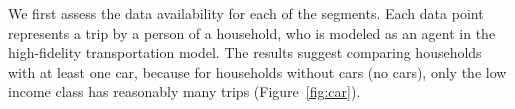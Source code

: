 We first assess the data availability for each of the segments. Each data point represents a trip by a person of a household, who is  modeled as an agent in the high-fidelity transportation model. The results suggest comparing households with at least one car, because for households without cars (no cars), only the low income class has reasonably many trips (Figure~\ref{fig:car}). 






 
